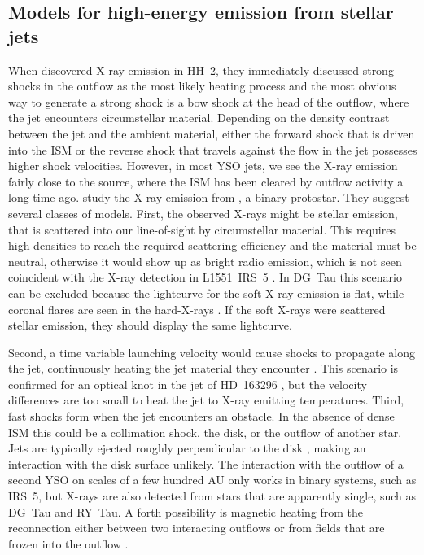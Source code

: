 \documentclass[manuscript]{aastex}
\begin{document}
\subsection{Models for high-energy emission from stellar jets}
\label{sect:intromodel}
When \citet{2001Natur.413..708P} discovered X-ray emission in HH~2, they immediately discussed strong shocks in the outflow as the most likely heating process and the most obvious way to generate a strong shock is a bow shock at the head of the outflow, where the jet encounters circumstellar material. Depending on the density contrast between the jet and the ambient material, either the forward shock that is driven into the ISM or the reverse shock that travels against the flow in the jet possesses higher shock velocities. However, in most YSO jets, we see the X-ray emission fairly close to the source, where the ISM has been cleared by outflow activity a long time ago. \citet{2003ApJ...584..843B} study the X-ray emission from , a binary protostar. They suggest several classes of models. First, the observed X-rays might be stellar emission, that is scattered into our line-of-sight by circumstellar material. This requires high densities to reach the required scattering efficiency and the material must be neutral, otherwise it would show up as bright radio emission, which is not seen coincident with the X-ray detection in L1551~IRS~5 \citep{2003ApJ...584..843B}. In DG~Tau this scenario can be excluded because the lightcurve for the soft X-ray emission is flat, while coronal flares are seen in the hard-X-rays \citep{2011ASPC..448..617G}. If the soft X-rays were scattered stellar emission, they should display the same lightcurve.

Second, a time variable launching velocity would cause shocks to propagate along the jet, continuously heating the jet material they encounter \textbf{\citep[e.g.][]{2010A&A...511A..42B,2010A&A...517A..68B}}. This scenario is confirmed for an optical knot in the jet of HD~163296 \citep{2013A&A...552A.142G}, but the velocity differences are too small to heat the jet to X-ray emitting temperatures. Third, fast shocks form when the jet encounters an obstacle. In the absence of dense ISM this could be a collimation shock, the disk, or the outflow of another star. Jets are typically ejected roughly perpendicular to the disk \citep[e.g.][for IRS 5]{2002A&A...382..573F}, making an interaction with the disk surface unlikely. The interaction with the outflow of a second YSO on scales of a few hundred AU only works in binary systems, such as IRS~5, but X-rays are also detected from stars that are apparently single, such as DG~Tau and RY~Tau. A forth possibility is magnetic heating from the reconnection either between two interacting outflows \citep{2008A&A...478..453M} or from fields that are frozen into the outflow \citep{2013A&A...550L...1S}.
\end{document}
